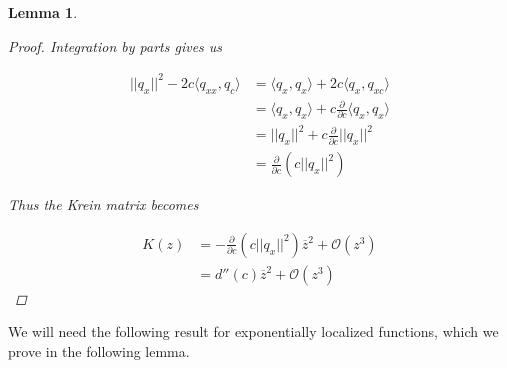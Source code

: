 \documentclass[12pt]{article}
\newtheorem{lemma}{Lemma}
\begin{document}
\begin{lemma}
\begin{proof}
Integration by parts gives us

\begin{align*}
||q_x||^2 - 2c \langle q_{xx}, q_c \rangle &= \langle q_x, q_x \rangle + 2c \langle q_{x}, q_{xc} \rangle  \\
&= \langle q_x, q_x \rangle + c \frac{\partial}{\partial c}\langle q_x, q_x \rangle \\
&= ||q_x||^2 + c \frac{\partial}{\partial c}||q_x||^2 \\
&= \frac{\partial}{\partial c} \left( c||q_x||^2 \right)
\end{align*}

Thus the Krein matrix becomes 

\begin{align*}
K(z) &= -\frac{\partial}{\partial c} \left( c||q_x||^2 \right) \overline{z}^2 + \mathcal{O}(z^3) \\
&= d''(c) \overline{z}^2 + \mathcal{O}(z^3)
\end{align*}

\end{proof}
\end{lemma}

We will need the following result for exponentially localized functions, which we prove in the following lemma.
\end{document}
